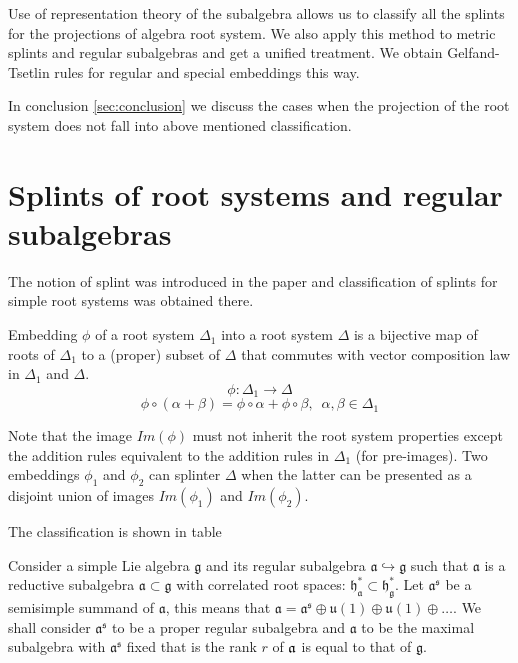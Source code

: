 \documentclass{article}
\begin{document}
Use of representation theory of the subalgebra allows us to classify all the splints for the projections
of algebra root system. We also apply this method to metric splints and regular subalgebras and get
a unified treatment. We obtain Gelfand-Tsetlin rules for regular and special embeddings this way.

In conclusion \ref{sec:conclusion} we discuss the cases when the projection of the root system does
not fall into above mentioned classification.

\section{Splints of root systems and regular subalgebras}
\label{sec:splints-root-systems}
The notion of splint was introduced in the paper \cite{richter2008splints} and classification of
splints for simple root systems was obtained there. 

Embedding $\phi$ of a root system $\Delta_1$ into a root system
$\Delta$ is a bijective map of roots of $\Delta_{1}$ to a (proper)
subset of $\Delta$ that commutes with vector composition law in
$\Delta_{1}$ and $\Delta$.
\begin{equation*}
\phi:\Delta_1 \longrightarrow \Delta
\end{equation*}
\begin{equation*}
\phi \circ (\alpha + \beta) =\phi \circ \alpha + \phi \circ \beta,
\,\,\, \alpha,\beta \in \Delta_1
\end{equation*}

Note that the image $Im(\phi)$ must not inherit the root system
properties except the addition rules equivalent to the addition
rules in $\Delta_{1}$ (for pre-images). Two embeddings $\phi_1$ and $\phi_2$  
can splinter $\Delta$  when the latter can be presented 
as a disjoint union of images $Im(\phi_1)$ and $Im(\phi_2)$.   

The classification is shown in table

Consider a simple Lie algebra $\mathfrak{g}$ and its regular subalgebra $%
\mathfrak{a}\hookrightarrow \mathfrak{g}$ such that $\mathfrak{a}$
is a
reductive subalgebra $\mathfrak{a \subset g}$ with correlated root spaces: $%
\mathfrak{h}_{\mathfrak{a}}^{\ast }\subset \mathfrak{h}_{\mathfrak{g }%
}^{\ast }$. Let $\mathfrak{a}^{\mathfrak{s}}$ be a semisimple summand of
$\mathfrak{a}$,
this means that $\mathfrak{a}=\mathfrak{a}^{\mathfrak{s}} \oplus \mathfrak{u}(1)\oplus %
\mathfrak{u}(1)\oplus \dots$. We shall consider $\mathfrak{a}^{\mathfrak{s}}$
to be a proper regular subalgebra and $\mathfrak{a}$ to be the
maximal subalgebra with $\mathfrak{a}^{\mathfrak{s}}$ fixed that is the rank
$r$ of $\frak{a}$ is equal to that of $\mathfrak{g}$.
\end{document}
